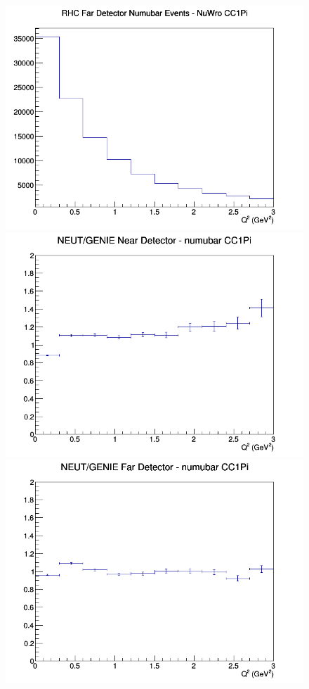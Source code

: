 \documentclass[12pt]{article}
\begin{document}
\begin{figure}[h]
\endminipage
{}
\includegraphics[width=\linewidth]{eff_Q2/GAr/CC1Pi_RHC_FD_numubar_Q2_NuWro.png}
\endminipage
\newline
{}
\includegraphics[width=\linewidth]{eff_Q2/GAr/ratios/CC1Pi_NEUT_GENIE_numubar_near_Q2.png}
\endminipage
{}
\includegraphics[width=\linewidth]{eff_Q2/GAr/ratios/CC1Pi_NEUT_GENIE_numubar_far_Q2.png}

\end{figure}
\end{document}
